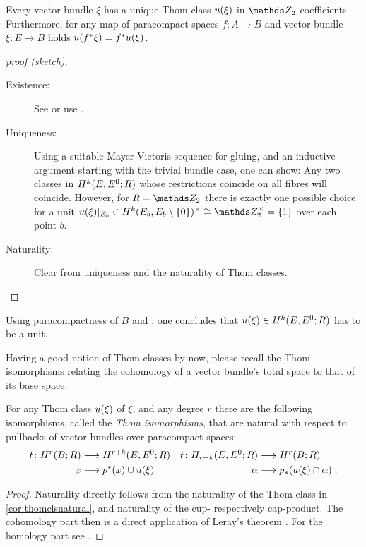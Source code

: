 \begin{Cor}
  Every vector bundle $\xi$ has a unique Thom class ${u}(\xi)$ in
  $\Zmod2$-coefficients.
  Furthermore, for any map of paracompact spaces $f\colon A\to B$ and
  vector bundle $\xi\colon E\to B$ holds ${u}({f}^* \xi) = {f}^* {u}(\xi)$.
  \begin{proof}[proof (sketch)]
    \begin{description}
    \item[Existence:] See \cite[Theorem~4D.10]{hatcher} or use
      \cite[Proposition~17.9.3]{tomdieck}.
    \item[Uniqueness:] %
      Using a suitable Mayer-Vietoris sequence for gluing, and an
      inductive argument starting with the trivial bundle case, one can show:
      Any two classes in $H^{k}(E, {E}^0;R)$ whose
      restrictions coincide on all fibres will coincide.
      However, for $R=\Zmod2$ there is exactly one possible choice for
      a unit $\u{\xi}|_{E_b}\in
      \H^{\rkk}(\spherepair{E_b})^\times\cong\Zmod2^\times=\{1\}$
      over each point $b$.
    \item[Naturality:] Clear from uniqueness and the naturality of Thom classes.
    \end{description}
  \end{proof}
\end{Cor}

\begin{Rem}
  Using paracompactness of $B$ and
  \cite[Proposition~17.9.6]{tomdieck}, one concludes that
  ${u}(\xi)\in H^{k}(E, {E}^0;R)$ has to be a unit.
\end{Rem}

Having a good notion of Thom classes by now, please recall the Thom
isomorphisms relating the cohomology of a vector bundle's total
space to that of its base space.
\begin{Thm}
  For any Thom class ${u}(\xi)$ of $\xi$, and any degree $r$ there are
  the following isomorphisms, called the \emph{Thom isomorphisms},
  that are natural with respect to pullbacks of vector bundles over
  paracompact spaces:
  \begin{align*}
    t\colon
    H^r(B;R) &\longrightarrow H^{r+k}(E, {E}^0; R)
    & t\colon
      H_{r+k}(E, {E}^0; R) &\longrightarrow H^r(B;R)
    \\
    x &\longrightarrow {p}^* (x) \cup {u}(\xi)
    & \alpha &\longrightarrow {p}_* ({u}(\xi) \cap \alpha)
               \;.
  \end{align*}
  \begin{proof}
    Naturality directly follows from the naturality of the Thom class
    in \autoref{cor:thomclsnatural}, and naturality of the cup-
    respectively cap-product.
    The cohomology part then is a direct application of Leray's theorem
    \cite[Theorem~4D.8]{hatcher}.
    For the homology part see \forexample \cite[Theorem~14.6]{switzer}.
  \end{proof}
\end{Thm}

